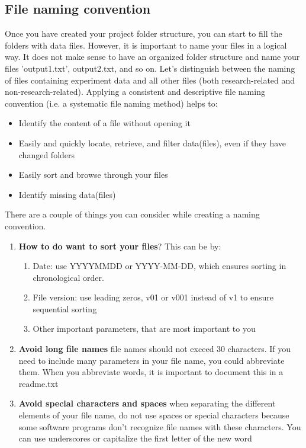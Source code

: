 \subsection{File naming convention}
Once you have created your project folder structure, you can start to fill the folders with data files. However, it is important to name your files in a logical way. It does not make sense to have an organized folder structure and name your files 'output1.txt', output2.txt, and so on. Let's distinguish between the naming of files containing experiment data and all other files (both research-related and non-research-related).
\whiteline
Applying a consistent and descriptive file naming convention (i.e. a systematic file naming method) helps to:
\begin{itemize}
	\item Identify the content of a file without opening it
	\item Easily and quickly locate, retrieve, and filter data(files), even if they have changed folders
	\item Easily sort and browse through your files
	\item Identify missing data(files)
\end{itemize}
\whiteline
There are a couple of things you can consider while creating a naming convention. 
\begin{enumerate}
	\item \textbf{How to do want to sort your files}? This can be by:
		\begin{enumerate}
			\item Date: use YYYYMMDD or YYYY-MM-DD, which ensures sorting in chronological order.
			\item File version: use leading zeros, v01 or v001 instead of v1 to ensure sequential sorting
			\item Other important parameters, that are most important to you
			\end{enumerate}
		\item \textbf{Avoid long file names} file names should not exceed 30 characters. If you need to include many parameters in your file name, you could abbreviate them. When you abbreviate words, it is important to document this in a readme.txt 
	\item \textbf{Avoid special characters and spaces} when separating the different elements of your file name, do not use spaces or special characters because some software programs don't recognize file names with these characters. You can use underscores or capitalize the first letter of the new word 
\end{enumerate}

